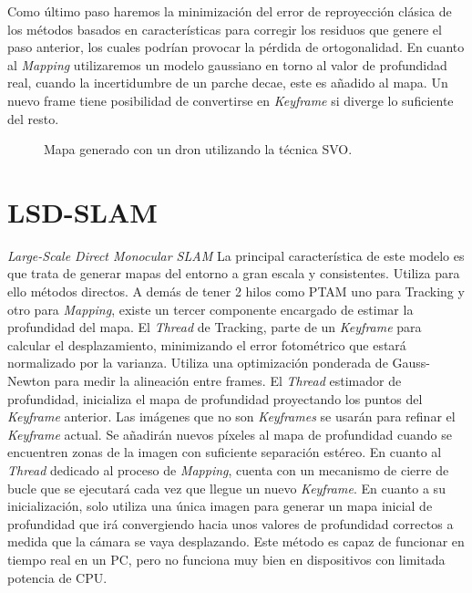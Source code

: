  Como último paso haremos la minimización del error de reproyección clásica de los métodos basados en características para corregir los residuos que genere el paso anterior, los cuales podrían provocar la pérdida de ortogonalidad.
En cuanto al \textit{Mapping} utilizaremos un modelo gaussiano en torno al valor de profundidad real, cuando la incertidumbre de un parche decae, este es añadido al mapa.
Un nuevo frame tiene posibilidad de convertirse en \textit{Keyframe} si diverge lo suficiente del resto.

\begin{figure}[H]
\begin{center}
\end{center}
\caption{Mapa generado con un dron utilizando la técnica SVO.}
\end{figure}


\section{LSD-SLAM} 
\textit {Large-Scale Direct Monocular SLAM}
La principal característica de este modelo es que trata de generar mapas del entorno a gran escala y consistentes.
Utiliza para ello métodos directos. A demás de tener 2 hilos como PTAM uno para Tracking y otro para \textit{Mapping}, existe un tercer componente encargado de estimar la profundidad del mapa.\cite{Engel2014lsd}
El \textit{Thread} de Tracking, parte de un \textit{Keyframe}  para calcular el desplazamiento, minimizando el error fotométrico que estará normalizado por la varianza. Utiliza una optimización ponderada de Gauss-Newton para medir la alineación entre frames.
El \textit{Thread} estimador de profundidad, inicializa el mapa de profundidad proyectando los puntos del \textit{Keyframe} anterior. Las imágenes que no son \textit{Keyframes} se usarán para refinar el \textit{Keyframe} actual. Se añadirán nuevos píxeles al mapa de profundidad cuando se encuentren zonas de la imagen con suficiente separación estéreo.
En cuanto al \textit{Thread} dedicado al proceso de \textit{Mapping}, cuenta con un mecanismo de cierre de bucle que se ejecutará cada vez que llegue un nuevo \textit{Keyframe}. En cuanto a su inicialización, solo utiliza una única imagen para generar un mapa inicial de profundidad que irá convergiendo hacia unos valores de profundidad correctos a medida que la cámara se vaya desplazando.
Este método es capaz de funcionar en tiempo real en un PC, pero  no funciona muy bien en dispositivos con limitada potencia de CPU.


